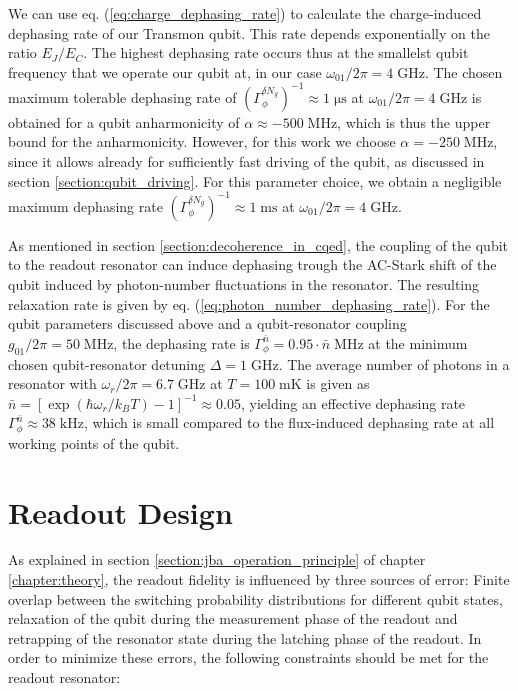 We can use eq. (\ref{eq:charge_dephasing_rate}) to calculate the charge-induced dephasing rate of our Transmon qubit. This rate depends exponentially on the ratio $E_J/E_C$. The highest dephasing rate occurs thus at the smallelst qubit frequency that we operate our qubit at, in our case $\omega_{01}/2\pi=4\;\mathrm{GHz}$. The chosen maximum tolerable dephasing rate of $\left(\Gamma_{\phi}^{\delta N_g}\right)^{-1} \approx 1\;\mathrm{\mu s}$ at $\omega_{01}/2\pi=4\;\mathrm{GHz}$ is obtained for a qubit anharmonicity of $\alpha\approx-500\;\mathrm{MHz}$, which is thus the upper bound for the anharmonicity. However, for this work we choose $\alpha=-250\;\mathrm{MHz}$, since it allows already for sufficiently fast driving of the qubit, as discussed in section \ref{section:qubit_driving}. For this parameter choice, we obtain a negligible maximum dephasing rate $\left(\Gamma_{\phi}^{\delta N_g}\right)^{-1} \approx 1\;\mathrm{ms}$ at $\omega_{01}/2\pi=4\;\mathrm{GHz}$. 

\smallskip

As mentioned in section \ref{section:decoherence_in_cqed}, the coupling of the qubit to the readout resonator can induce dephasing trough the AC-Stark shift of the qubit induced by photon-number fluctuations in the resonator. The resulting relaxation rate is given by eq. (\ref{eq:photon_number_dephasing_rate}). For the qubit parameters discussed above and a qubit-resonator coupling $g_{01}/2\pi=50\;\mathrm{MHz}$, the dephasing rate is $\Gamma_\phi^{\bar{n}}= 0.95\cdot{\bar{n}} \;\mathrm{MHz}$ at the minimum chosen qubit-resonator detuning $\Delta = 1 \;\mathrm{GHz}$. The average number of photons in a resonator with $\omega_{r}/2\pi = 6.7\;\mathrm{GHz}$ at $T=100\;\mathrm{mK}$ is given as $\bar{n} = [\exp{(\hbar\omega_r/k_B T)-1}]^{-1} \approx 0.05$, yielding an effective dephasing rate $\Gamma_\phi^{\bar{n}}\approx 38\;\mathrm{kHz}$, which is small compared to the flux-induced dephasing rate at all working points of the qubit.

\section{Readout Design}

As explained in section \ref{section:jba_operation_principle} of chapter \ref{chapter:theory}, the readout fidelity is influenced by three sources of error: Finite overlap between the switching probability distributions for different qubit states, relaxation of the qubit during the measurement phase of the readout and retrapping of the resonator state during the latching phase of the readout. In order to minimize these errors, the following constraints should be met for the readout resonator:


